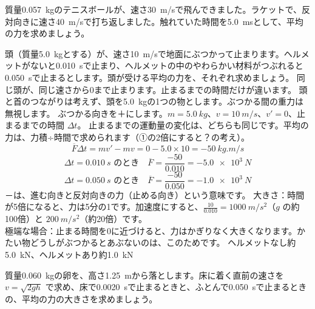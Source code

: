 \begin{jibun}
質量\qty{0.057}{kg}のテニスボールが、速さ\qty{30}{m/s}で飛んできました。ラケットで、反対向きに速さ\qty{40}{m/s}で打ち返しました。触れていた時間を\qty{5.0}{ms}として、平均の力を求めましょう。
\end{jibun}

\label{ph:力-3:ex2}
\begin{phreidai}
頭（質量\qty{5.0}{kg}とする）が、速さ\qty{10}{m/s}で地面にぶつかって止まります。ヘルメットがないと\qty{0.010}{s}で止まり、ヘルメットの中のやわらかい材料がつぶれると\qty{0.050}{s}で止まるとします。頭が受ける平均の力を、それぞれ求めましょう。
\phbamen
同じ頭が、同じ速さから0まで止まります。止まるまでの時間だけが違います。
\phmushi
頭と首のつながりは考えず、頭を\qty{5.0}{kg}の1つの物とします。ぶつかる間の重力は無視します。
\phzu
ぶつかる向きを＋にします。$m=\qty{5.0}{kg}$、$v=\qty{10}{m/s}$、$v'=0$、止まるまでの時間 $\Delta t$。
\phriyu
止まるまでの運動量の変化は、どちらも同じです。平均の力は、力積÷時間で求められます（①の2倍にすると？の考え）。
\phtateru
\[\overline{F}\Delta t=mv'-mv=0-5.0\times10=\qty{-50}{kg.m/s}\]
\phtoku
\[\Delta t=\qty{0.010}{s}\text{ のとき}\quad \overline{F}=\frac{-50}{0.010}=\qty{-5.0e3}{N}\]
\[\Delta t=\qty{0.050}{s}\text{ のとき}\quad \overline{F}=\frac{-50}{0.050}=\qty{-1.0e3}{N}\]
－は、進む向きと反対向きの力（止める向き）という意味です。
\phtashikame
大きさ：時間が5倍になると、力は5分の1です。加速度にすると、$\tfrac{10}{0.010}=\qty{1000}{m/s^2}$（$g$ の約100倍）と $\qty{200}{m/s^2}$（約20倍）です。\\
極端な場合：止まる時間を0に近づけると、力はかぎりなく大きくなります。かたい物どうしがぶつかるとあぶないのは、このためです。
\kotae ヘルメットなし約\qty{5.0}{kN}、ヘルメットあり約\qty{1.0}{kN}
\end{phreidai}
\begin{jibun}
質量\qty{0.060}{kg}の卵を、高さ\qty{1.25}{m}から落とします。床に着く直前の速さを $v=\sqrt{2gh}$ で求め、床で\qty{0.0020}{s}で止まるときと、ふとんで\qty{0.050}{s}で止まるときの、平均の力の大きさを求めましょう。
\end{jibun}

